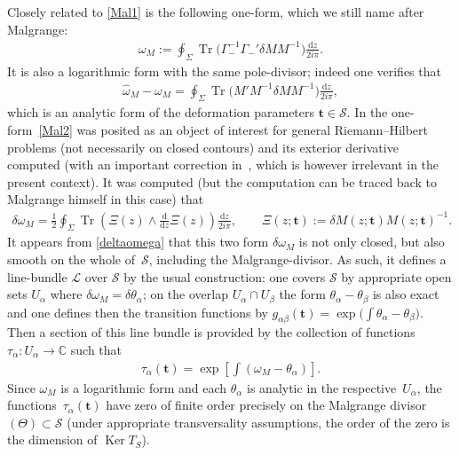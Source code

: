 \documentclass[pdftex]{sigma}
\numberwithin{equation}{section}
\def \ddz{ \frac {\d z}{2i\pi}}
\def \G{\Gamma}
\def\C{{\mathbb C}}
\def\wh{\widehat}
\def\d{\mathrm d}
\def \t{\mathbf t}
\begin{document}
Closely related to \eqref{Mal1} is the following one-form, which we still name after Malgrange:
\begin{gather}\label{Mal2}
\omega_M := \oint_{\Sigma} \operatorname{Tr} \big(\G_-^{-1} \G_-' \delta M M^{-1}\big) \ddz.
\end{gather}
It is also a logarithmic form with the same pole-divisor; indeed one verif\/ies that
\begin{gather*}
\wh \omega_M - \omega_M = \oint_\Sigma \operatorname{Tr} \big(M' M^{-1} \delta M M^{-1}\big) \ddz,
\end{gather*}
which is an analytic form of the deformation parameters $\t\in \mathcal S$. In \cite{BertolaIsoTau} the one-form~\eqref{Mal2} was posited as an object of interest for general Riemann--Hilbert problems (not necessarily on closed contours) and its exterior derivative computed (with an important correction in~\cite{BertolaCorrection}, which is however irrelevant in the present context). It was computed (but the computation can be traced back to Malgrange himself in this case) that
\begin{gather}\label{deltaomega}
\delta \omega_M = \frac 1 2 \oint_{\Sigma} \operatorname{Tr} \left(\Xi(z) \wedge \frac {\d}{\d z} \Xi(z) \right)\ddz, \qquad \Xi(z;\t):= \delta M(z;\t) M(z;\t)^{-1}.
\end{gather}
It appears from \eqref{deltaomega} that this two form $\delta \omega_M$ is not only closed, but also smooth on the whole of~$\mathcal S$, including the Malgrange-divisor. As such, it def\/ines a line-bundle $\mathcal L$ over $\mathcal S$ by the usual construction: one covers $\mathcal S$ by appropriate open sets $U_\alpha$ where $\delta \omega_M =\delta \theta_\alpha$; on the overlap $U_\alpha \cap U_\beta$ the form $\theta_{\alpha }-\theta_{\beta}$ is also exact and one def\/ines then the transition functions by $g_{\alpha\beta}(\t) = \exp \big(\int \theta_{\alpha}-\theta_\beta\big)$. Then a section of this line bundle is provided by the collection of functions $\tau_\alpha\colon U_\alpha \to \C$ such that
\begin{gather*}
\tau_{\alpha}(\t) =\exp\left[\int ( \omega_M - \theta_\alpha )\right].
\end{gather*}
Since $\omega_M$ is a logarithmic form and each $\theta_\alpha$ is analytic in the respective~$U_\alpha$, the func\-tions~$\tau_\alpha(\t)$ have zero of f\/inite order precisely on the Malgrange divisor $(\Theta)\subset \mathcal S$ (under appropriate transversality assumptions, the order of the zero is the dimension of $\operatorname{Ker} T_S$).
\end{document}
